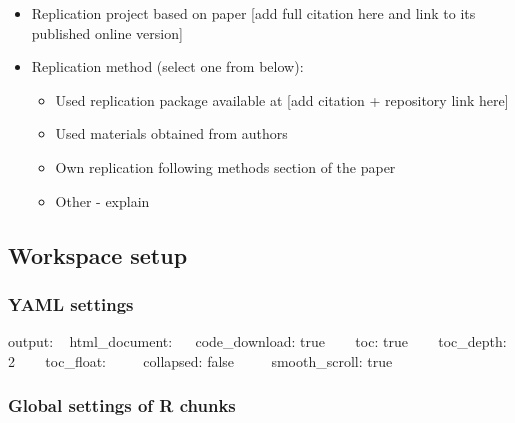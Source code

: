 \documentclass[
]{article}
\newenvironment{Shaded}{\begin{snugshade}}{\end{snugshade}}
\newcommand{\AttributeTok}[1]{\textcolor[rgb]{0.77,0.63,0.00}{#1}}
\newcommand{\CommentTok}[1]{\textcolor[rgb]{0.56,0.35,0.01}{\textit{#1}}}
\newcommand{\ConstantTok}[1]{\textcolor[rgb]{0.00,0.00,0.00}{#1}}
\newcommand{\FunctionTok}[1]{\textcolor[rgb]{0.00,0.00,0.00}{#1}}
\newcommand{\NormalTok}[1]{#1}
\newcommand{\SpecialCharTok}[1]{\textcolor[rgb]{0.00,0.00,0.00}{#1}}
\providecommand{\tightlist}{%
  \setlength{\itemsep}{0pt}\setlength{\parskip}{0pt}}
\begin{document}
\begin{itemize}
\tightlist
\item
  Replication project based on paper {[}add full citation here and link
  to its published online version{]}
\item
  Replication method (select one from below):

  \begin{itemize}
  \tightlist
  \item
    Used replication package available at {[}add citation + repository
    link here{]}
  \item
    Used materials obtained from authors
  \item
    Own replication following methods section of the paper
  \item
    Other - explain
  \end{itemize}
\end{itemize}

\hypertarget{workspace-setup}{%
\subsection{Workspace setup}\label{workspace-setup}}

\hypertarget{yaml-settings}{%
\subsubsection{YAML settings}\label{yaml-settings}}

output: ~ html\_document: ~~ code\_download: true ~~~ toc: true ~~~
toc\_depth: 2 ~~~ toc\_float: ~~~~ collapsed: false ~~~~ smooth\_scroll:
true

\hypertarget{global-settings-of-r-chunks}{%
\subsubsection{Global settings of R
chunks}\label{global-settings-of-r-chunks}}

\begin{Shaded}
\end{Shaded}
\end{document}
